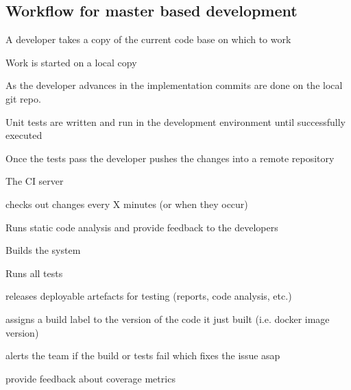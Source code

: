 \documentclass[a4paper,
               keeplastbox,   %
               ]{jacow}
\begin{document}
\subsection{Workflow for master based development}
\begin{Itemize}
    \item A developer takes a copy of the current code base on which to work
    \item Work is started on a local copy
    \item As the developer advances in the implementation commits are done on the local git repo. 
    \item Unit tests are written and run in the development environment until successfully executed
    \item Once the tests pass the developer pushes the changes into a remote repository 
    \item The CI server 
\begin{Itemize}
    \item checks out changes every X minutes (or when they occur)
    \item Runs static code analysis and provide feedback to the developers
    \item Builds the system 
    \item Runs all tests
    \item releases deployable artefacts for testing (reports, code analysis, etc.)
    \item assigns a build label to the version of the code it just built (i.e. docker image version)
    \item alerts the team if the build or tests fail which fixes the issue asap
    \item provide feedback about coverage metrics
\end{Itemize}
\end{Itemize}
\end{document}
